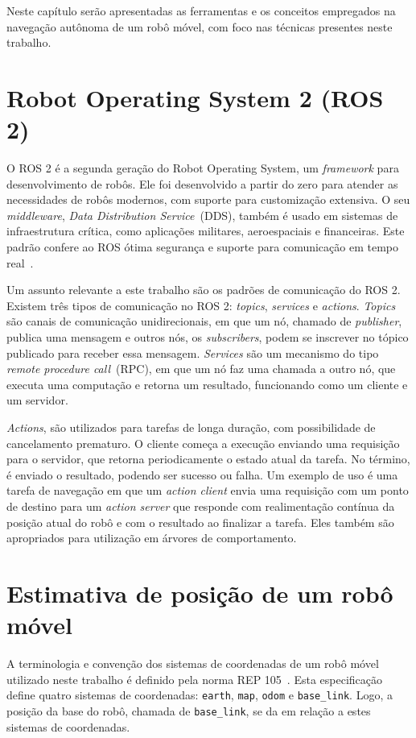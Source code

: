 \documentclass[repeatfields,xlists,xpacks,oneside,yearsonly]{ufrgscca}
\begin{document}
Neste capítulo serão apresentadas as ferramentas e os conceitos
empregados na navegação autônoma de um robô móvel, com foco nas
técnicas presentes neste trabalho.

\section{Robot Operating System 2 (ROS 2)}

O ROS 2 é a segunda geração do Robot Operating System, um
\textit{framework} para desenvolvimento de robôs. Ele foi
desenvolvido a partir do zero para atender as necessidades de robôs
modernos, com suporte para customização extensiva. O seu
\textit{middleware}, \textit{Data Distribution Service}~(DDS), também
é usado em sistemas de infraestrutura crítica, como aplicações
militares, aeroespaciais e financeiras. Este padrão confere ao ROS
ótima segurança e suporte para comunicação em tempo
real~\cite{ROS2Article}.

Um assunto relevante a este trabalho são os padrões de comunicação do
ROS 2. Existem três tipos de comunicação no ROS 2: \textit{topics},
\textit{services} e \textit{actions}. \textit{Topics} são canais de
comunicação unidirecionais, em que um nó, chamado de
\textit{publisher}, publica uma mensagem e outros nós, os
\textit{subscribers}, podem se inscrever no tópico publicado para
receber essa mensagem. \textit{Services} são um mecanismo do tipo
\textit{remote procedure call}~(RPC), em que um nó faz uma chamada a
outro nó, que executa uma computação e retorna um resultado,
funcionando como um cliente e um servidor.

\textit{Actions}, são utilizados para tarefas de longa duração, com possibilidade de
cancelamento prematuro.
O cliente começa a execução enviando uma requisição para o servidor,
que retorna periodicamente o estado atual da tarefa.
No término, é enviado o resultado, podendo ser sucesso ou falha.
Um exemplo de uso é uma tarefa de navegação em que um \textit{action client}
envia uma requisição com um ponto de destino para um \textit{action server}
que responde com realimentação contínua da posição atual do robô e
com o resultado ao finalizar a tarefa.
Eles também são apropriados para utilização em árvores de comportamento.

\section{Estimativa de posição de um robô móvel}

A terminologia e convenção dos sistemas de coordenadas de um robô
móvel utilizado neste trabalho é definido pela norma REP
105~\cite{rep_105}. Esta especificação define quatro sistemas de
coordenadas: \texttt{earth}, \texttt{map}, \texttt{odom} e
\texttt{base\_link}. Logo, a posição da base do robô, chamada de
\texttt{base\_link}, se da em relação a estes sistemas de
coordenadas.
\end{document}
